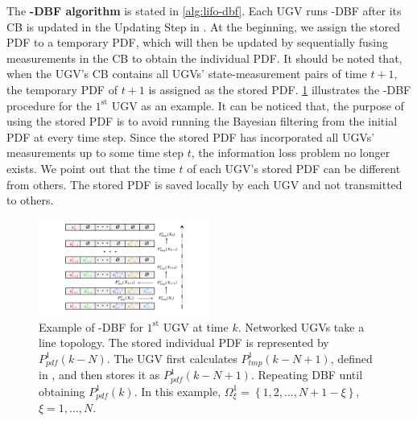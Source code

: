 	The \textbf{\proto-DBF algorithm} is stated in \cref{alg:lifo-dbf}.
	Each UGV runs \proto-DBF after its CB is updated in the Updating Step in .
	At the beginning, we assign the stored PDF to a temporary PDF, which will then be updated by sequentially fusing measurements in the CB to obtain the individual PDF.
	It should be noted that, when the UGV's CB contains all UGVs' state-measurement pairs of time $t+1$, the temporary PDF of $t+1$ is assigned as the stored PDF.
	\cref{fig:LIFO-DBF} illustrates the \proto-DBF procedure for the $1^\text{st}$ UGV as an example.
	It can be noticed that, the purpose of using the stored PDF is to avoid running the Bayesian filtering from the initial PDF at every time step. 
	Since the stored PDF has incorporated all UGVs' measurements up to some time step $t$, the information loss problem no longer exists. %
	We point out that the time $t$ of each UGV's stored PDF can be different from others.
	The stored PDF is saved locally by each UGV and not transmitted to others.
	
	\begin{figure}%
		\centering
		\includegraphics[width=0.50\textwidth]{figures/fifo-dbf}
		\caption{Example of \proto-DBF for $1^\text{st}$ UGV at time $k$.
			Networked UGVs take a line topology.
			The stored individual PDF is represented by $ P^1_{pdf}(k-N)$.
			The UGV first calculates $ P^1_{tmp}(k-N+1)$, defined in , and then stores it as $ P^1_{pdf}(k-N+1)$. 
			Repeating DBF until obtaining $ P^1_{pdf}(k)$.
			In this example, $\Omega^1_{\xi}=\left\lbrace 1,2,\dots,N+1-\xi\right\rbrace $, $\xi=1,\dots,N$.}
		\label{fig:LIFO-DBF}
		\vspace{-1em}
	\end{figure}
	
